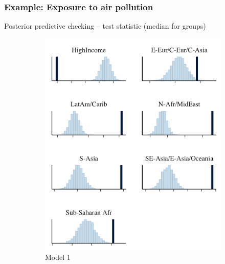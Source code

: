 \documentclass[10pt,handout]{beamer}
\begin{document}
\begin{frame}

\frametitle{Example: Exposure to air pollution}


  Posterior predictive checking -- test statistic (median for groups)

  \begin{figure}
\centering
\begin{subfigure}{.31\textwidth}
\includegraphics[width=\textwidth]{figs/ppc_med_grouped1.png}
\caption{Model 1}
\end{subfigure}
~
\begin{subfigure}{.31\textwidth}

\end{subfigure}
\end{figure}
\end{frame}
\end{document}
